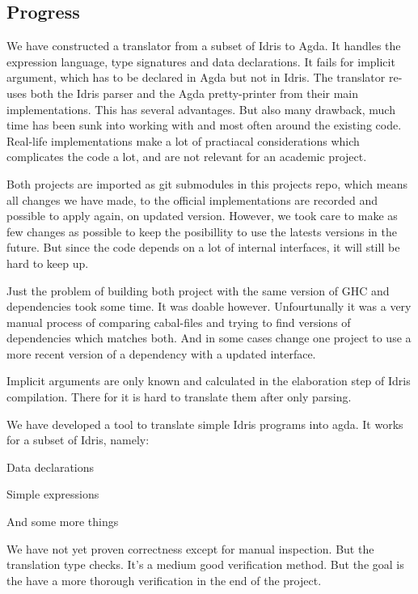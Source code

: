 \documentclass[parskip=half]{scrartcl}
\begin{document}
\subsection{Progress}

We have constructed a translator from a subset of Idris to Agda. It handles the
expression language, type signatures and data declarations.  It fails for
implicit argument, which has to be declared in Agda but not in Idris. The
translator re-uses both the Idris parser and the Agda pretty-printer from their
main implementations. This has several advantages. But also many drawback, much
time has been sunk into working with and most often around the existing code.
Real-life implementations make a lot of practiacal considerations which
complicates the code a lot, and are not relevant for an academic project.

Both projects are imported as git submodules in this projects repo, which means
all changes we have made, to the official implementations are recorded and
possible to apply again, on updated version. However, we took care to make as
few changes as possible to keep the posibillity to use the latests versions in
the future. But since the code depends on a lot of internal interfaces, it will
still be hard to keep up.

Just the problem of building both project with the same version of GHC and
dependencies took some time. It was doable however. Unfourtunally it was a very
manual process of comparing cabal-files and trying to find versions of
dependencies which matches both. And in some cases change one project to use
a more recent version of a dependency with a updated interface.

Implicit arguments are only known and calculated in the elaboration step of
Idris compilation. There for it is hard to translate them after only parsing.

%
We have developed a tool to translate simple Idris programs into agda. It works
for a subset of Idris, namely:

\begin{enumeration}
  \item Data declarations
  \item Simple expressions
  \item And some more things
\end{enumeration}

We have not yet proven correctness except for manual inspection.
But the translation type checks. It's a medium good verification method. But the
goal is the have a more thorough verification in the end of the project.
\end{document}
